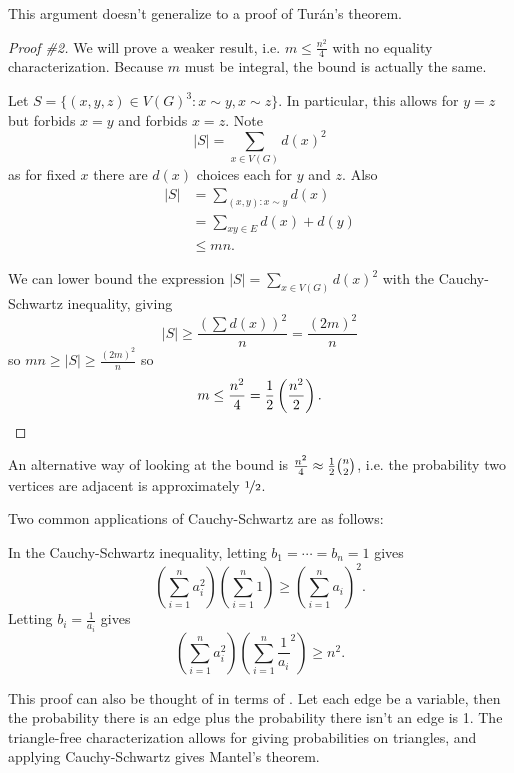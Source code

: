 \documentclass[main.tex]{subfiles}
\begin{document}
\begin{remark*}
  This argument doesn't generalize to a proof of Tur\'an's theorem.
\end{remark*}
\begin{proof}[Proof \#2]
  We will prove a weaker result, i.e. $m\leq\frac{n^2}{4}$ with no equality
  characterization.
  Because $m$ must be integral, the bound is actually the same.

  Let $S = \{(x,y,z)\in V(G)^3 : x\sim y, x\sim z\}$.
  In particular, this allows for $y = z$ but forbids $x = y$ and forbids $x = z$.
  Note
  \[
    |S| = \sum_{x\in V(G)} d(x)^2
  \]
  as for fixed $x$ there are $d(x)$ choices each for $y$ and $z$.
  Also
  \begin{align*}
    |S| &= \sum_{(x,y) : x\sim y} d(x) \\
        &= \sum_{xy\in E} d(x) + d(y) \\
        &\leq mn. \tag{since $G$ triangle-free, $d(x)+d(y)\leq n$}
  \end{align*}

  We can lower bound the expression $|S| = \sum_{x\in V(G)} d(x)^2$ with
  the Cauchy-Schwartz inequality, giving
  \[
    |S|\geq\frac{\left(\sum d(x)\right)^2}{n} = \frac{(2m)^2}{n}
  \]
  so $mn\geq|S|\geq\frac{(2m)^2}{n}$ so
  \[
    m\leq\frac{n^2}{4} = \frac{1}{2}\left(\frac{n^2}{2}\right). \qedhere
  \]
\end{proof}
\begin{remark*}
  An alternative way of looking at the bound is
  $\frac{n^2}{4}\approx\frac{1}{2}\binom n 2$, i.e. the probability two vertices are
  adjacent is approximately $\nicefrac 1 2$.
\end{remark*}
Two common applications of Cauchy-Schwartz are as follows:
\begin{remark*}
  In the Cauchy-Schwartz inequality, letting $b_1 = \cdots = b_n = 1$ gives
  \[
    \left(\sum_{i=1}^n a_i^2\right)\left(\sum_{i=1}^n 1\right)\geq
    \left(\sum_{i=1}^n a_i\right)^2.
  \]
  Letting $b_i = \frac{1}{a_i}$ gives
  \[
    \left(\sum_{i=1}^n a_i^2\right)\left(\sum_{i=1}^n\frac{1}{a_i}^2\right)\geq
    n^2.
  \]
\end{remark*}
This proof can also be thought of in terms of .
Let each edge be a variable, then the probability there is an edge plus the
probability there isn't an edge is 1.
The triangle-free characterization allows for giving probabilities on triangles,
and applying Cauchy-Schwartz gives Mantel's theorem.
\end{document}
